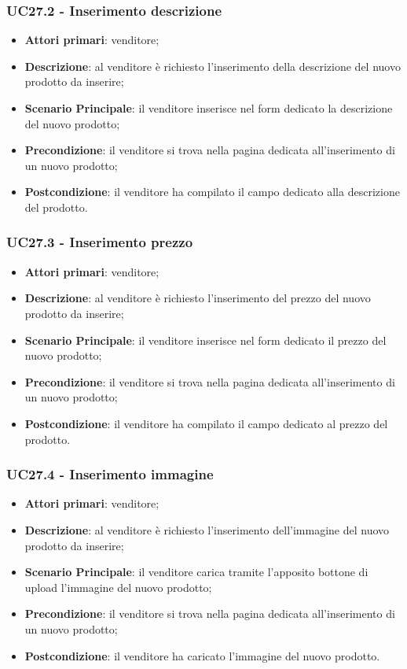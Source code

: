\subsubsection{UC27.2 - Inserimento descrizione}
\begin{itemize}
\item \textbf{Attori primari}: venditore;
\item \textbf{Descrizione}: al venditore è richiesto l'inserimento della descrizione del nuovo prodotto da inserire;
\item \textbf{Scenario Principale}: il venditore inserisce nel form dedicato la descrizione del nuovo prodotto;
\item \textbf{Precondizione}: il venditore si trova nella pagina dedicata all'inserimento di un nuovo prodotto;
\item \textbf{Postcondizione}: il venditore ha compilato il campo dedicato alla descrizione del prodotto.
\end{itemize}

\subsubsection{UC27.3 - Inserimento prezzo}
\begin{itemize}
\item \textbf{Attori primari}: venditore;
\item \textbf{Descrizione}: al venditore è richiesto l'inserimento del prezzo del nuovo prodotto da inserire;
\item \textbf{Scenario Principale}: il venditore inserisce nel form dedicato il prezzo del nuovo prodotto;
\item \textbf{Precondizione}: il venditore si trova nella pagina dedicata all'inserimento di un nuovo prodotto;
\item \textbf{Postcondizione}: il venditore ha compilato il campo dedicato al prezzo del prodotto.
\end{itemize}

\subsubsection{UC27.4 - Inserimento immagine}
\begin{itemize}
\item \textbf{Attori primari}: venditore;
\item \textbf{Descrizione}: al venditore è richiesto l'inserimento dell'immagine del nuovo prodotto da inserire;
\item \textbf{Scenario Principale}: il venditore carica tramite l'apposito bottone di upload l'immagine del nuovo prodotto;
\item \textbf{Precondizione}: il venditore si trova nella pagina dedicata all'inserimento di un nuovo prodotto;
\item \textbf{Postcondizione}: il venditore ha caricato l'immagine del nuovo prodotto.
\end{itemize}

